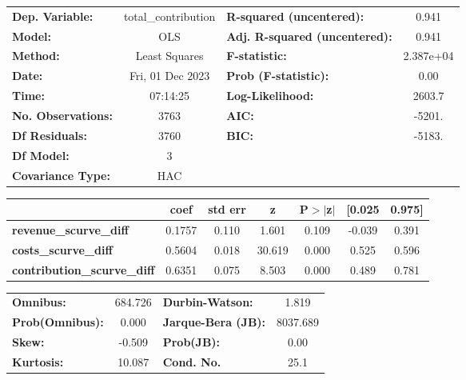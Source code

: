 \begin{center}
\begin{tabular}{lclc}
\toprule
\textbf{Dep. Variable:}             & total\_contribution & \textbf{  R-squared (uncentered):}      &     0.941   \\
\textbf{Model:}                     &         OLS         & \textbf{  Adj. R-squared (uncentered):} &     0.941   \\
\textbf{Method:}                    &    Least Squares    & \textbf{  F-statistic:       }          & 2.387e+04   \\
\textbf{Date:}                      &   Fri, 01 Dec 2023  & \textbf{  Prob (F-statistic):}          &     0.00    \\
\textbf{Time:}                      &       07:14:25      & \textbf{  Log-Likelihood:    }          &    2603.7   \\
\textbf{No. Observations:}          &          3763       & \textbf{  AIC:               }          &    -5201.   \\
\textbf{Df Residuals:}              &          3760       & \textbf{  BIC:               }          &    -5183.   \\
\textbf{Df Model:}                  &             3       & \textbf{                     }          &             \\
\textbf{Covariance Type:}           &         HAC         & \textbf{                     }          &             \\
\bottomrule
\end{tabular}
\begin{tabular}{lcccccc}
                                    & \textbf{coef} & \textbf{std err} & \textbf{z} & \textbf{P$> |$z$|$} & \textbf{[0.025} & \textbf{0.975]}  \\
\midrule
\textbf{revenue\_scurve\_diff}      &       0.1757  &        0.110     &     1.601  &         0.109        &       -0.039    &        0.391     \\
\textbf{costs\_scurve\_diff}        &       0.5604  &        0.018     &    30.619  &         0.000        &        0.525    &        0.596     \\
\textbf{contribution\_scurve\_diff} &       0.6351  &        0.075     &     8.503  &         0.000        &        0.489    &        0.781     \\
\bottomrule
\end{tabular}
\begin{tabular}{lclc}
\textbf{Omnibus:}       & 684.726 & \textbf{  Durbin-Watson:     } &    1.819  \\
\textbf{Prob(Omnibus):} &   0.000 & \textbf{  Jarque-Bera (JB):  } & 8037.689  \\
\textbf{Skew:}          &  -0.509 & \textbf{  Prob(JB):          } &     0.00  \\
\textbf{Kurtosis:}      &  10.087 & \textbf{  Cond. No.          } &     25.1  \\
\bottomrule
\end{tabular}
\end{center}